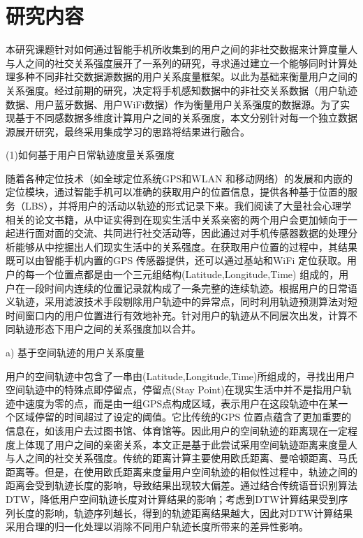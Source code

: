 \section{研究内容}
本研究课题针对如何通过智能手机所收集到的用户之间的非社交数据来计算度量人与人之间的社交关系强度展开了一系列的研究，寻求通过建立一个能够同时计算处理多种不同非社交数据源数据的用户关系度量框架。以此为基础来衡量用户之间的关系强度。经过前期的研究，决定将手机感知数据中的非社交关系数据（用户轨迹数据、用户蓝牙数据、用户WiFi数据）作为衡量用户关系强度的数据源。为了实现基于不同感数据多维度计算用户之间的关系强度，本文分别针对每一个独立数据源展开研究，最终采用集成学习的思路将结果进行融合。
\par (1)如何基于用户日常轨迹度量关系强度
\par 随着各种定位技术（如全球定位系统GPS和WLAN 和移动网络）的发展和内嵌的定位模块，通过智能手机可以准确的获取用户的位置信息，提供各种基于位置的服务（LBS），并将用户的活动以轨迹的形式记录下来。我们阅读了大量社会心理学相关的论文书籍，从中证实得到在现实生活中关系亲密的两个用户会更加倾向于一起进行面对面的交流、共同进行社交活动等，因此通过对手机传感器数据的处理分析能够从中挖掘出人们现实生活中的关系强度。在获取用户位置的过程中，其结果既可以由智能手机内置的GPS 传感器提供，还可以通过基站和WiFi 定位获取。用户的每一个位置点都是由一个三元组结构(Latitude,Longitude,Time) 组成的，用户在一段时间内连续的位置记录就构成了一条完整的连续轨迹。根据用户的日常语义轨迹，采用滤波技术手段剔除用户轨迹中的异常点，同时利用轨迹预测算法对短时间窗口内的用户位置进行有效地补充。针对用户的轨迹从不同层次出发，计算不同轨迹形态下用户之间的关系强度加以合并。
\par a) 基于空间轨迹的用户关系度量
\par  用户的空间轨迹中包含了一串由(Latitude,Longitude,Time)所组成的，寻找出用户空间轨迹中的特殊点即停留点，停留点(Stay Point)在现实生活中并不是指用户轨迹中速度为零的点，而是由一组GPS点构成区域，表示用户在这段轨迹中在某一个区域停留的时间超过了设定的阈值。它比传统的GPS 位置点蕴含了更加重要的信息在，如该用户去过图书馆、体育馆等。因此用户的空间轨迹的距离现在一定程度上体现了用户之间的亲密关系，本文正是基于此尝试采用空间轨迹距离来度量人与人之间的社交关系强度。传统的距离计算主要使用欧氏距离、曼哈顿距离、马氏距离等。但是，在使用欧氏距离来度量用户空间轨迹的相似性过程中，轨迹之间的距离会受到轨迹长度的影响，导致结果出现较大偏差。通过结合传统语音识别算法DTW，降低用户空间轨迹长度对计算结果的影响；考虑到DTW计算结果受到序列长度的影响，轨迹序列越长，得到的轨迹距离结果越大，因此对DTW计算结果采用合理的归一化处理以消除不同用户轨迹长度所带来的差异性影响。
